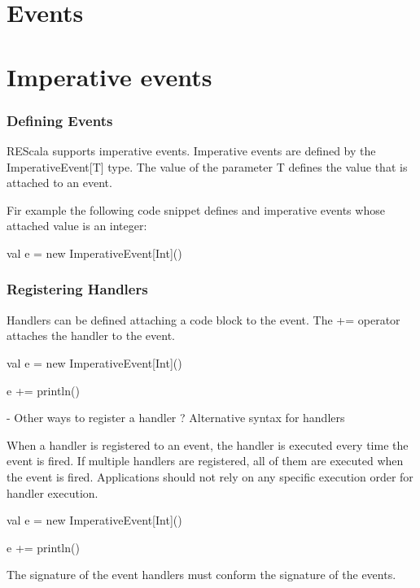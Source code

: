 \documentclass{llncs}
\newcommand{\code}[1]{{\fontfamily{cmtt}\small\selectfont#1}}
\begin{document}
\section{Events}


\section{Imperative events}

\subsubsection{Defining  Events}

REScala supports imperative events. Imperative events are defined by
the \code{ImperativeEvent[T]} type. The value of the parameter
\code{T} defines the value that is attached to an event.

Fir example the following code snippet defines and imperative events
whose attached value is an integer:
\begin{codenv}
val e = new ImperativeEvent[Int]()
\end{codenv}

\subsubsection{Registering Handlers}

Handlers can be defined attaching a code block to the event. The
\code{+=} operator attaches the handler to the event.

\begin{codenv}
val e = new ImperativeEvent[Int]()

e += { println() }
\end{codenv}

- Other ways to register a handler ? Alternative syntax for handlers


When a handler is registered to an event, the handler is executed
every time the event is fired. If multiple handlers are registered,
all of them are executed when the event is fired. Applications should
not rely on any specific execution order for handler execution.

\begin{codenv}
val e = new ImperativeEvent[Int]()

e += { println() }
\end{codenv}


The signature of the event handlers must conform the signature of the
events.
\end{document}

